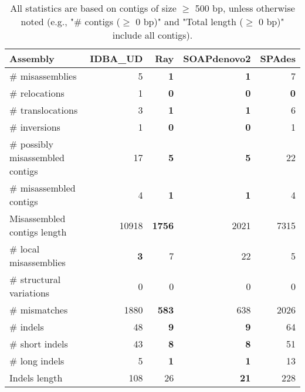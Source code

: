 \documentclass[12pt,a4paper]{article}
\begin{document}
\begin{table}[ht]
\begin{center}
\caption{All statistics are based on contigs of size $\geq$ 500 bp, unless otherwise noted (e.g., "\# contigs ($\geq$ 0 bp)" and "Total length ($\geq$ 0 bp)" include all contigs).}
\begin{tabular}{|l*{4}{|r}|}
\hline
Assembly & IDBA\_UD & Ray & SOAPdenovo2 & SPAdes \\ \hline
\# misassemblies & 5 & {\bf 1} & {\bf 1} & 7 \\ \hline
\hspace{5mm}\# relocations & 1 & {\bf 0} & {\bf 0} & {\bf 0} \\ \hline
\hspace{5mm}\# translocations & 3 & {\bf 1} & {\bf 1} & 6 \\ \hline
\hspace{5mm}\# inversions & 1 & {\bf 0} & {\bf 0} & 1 \\ \hline
\# possibly misassembled contigs & 17 & {\bf 5} & {\bf 5} & 22 \\ \hline
\# misassembled contigs & 4 & {\bf 1} & {\bf 1} & 4 \\ \hline
Misassembled contigs length & 10918 & {\bf 1756} & 2021 & 7315 \\ \hline
\# local misassemblies & {\bf 3} & 7 & 22 & 5 \\ \hline
\# structural variations & 0 & 0 & 0 & 0 \\ \hline
\# mismatches & 1880 & {\bf 583} & 638 & 2026 \\ \hline
\# indels & 48 & {\bf 9} & {\bf 9} & 64 \\ \hline
\hspace{5mm}\# short indels & 43 & {\bf 8} & {\bf 8} & 51 \\ \hline
\hspace{5mm}\# long indels & 5 & {\bf 1} & {\bf 1} & 13 \\ \hline
Indels length & 108 & 26 & {\bf 21} & 228 \\ \hline
\end{tabular}
\end{center}
\end{table}
\end{document}
